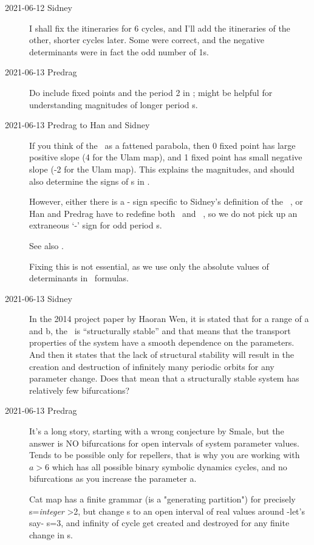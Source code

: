 \begin{description}
\item[2021-06-12 Sidney]
I shall fix the itineraries for 6 cycles, and I'll add the itineraries of
the other, shorter cycles later. Some were correct, and the negative
determinants were in fact the odd number of 1s.

\item[2021-06-13 Predrag]
Do include fixed points and the period 2 in ;
might be helpful for understanding magnitudes of longer period {\HillDet}s.

\item[2021-06-13 Predrag to Han and Sidney]
If you think of the \HenonMap\ as a fattened parabola, then 0 fixed point
has large positive slope (4 for the Ulam map), and 1 fixed point has
small negative slope (-2 for the Ulam map). This explains the magnitudes,
and should also determine the signs of {\HillDet}s in .

However, either there is a - sign specific to Sidney's definition of the
\Henon\ {\jacobianOrb}, or Han and Predrag have to redefine both
\templatt\ and \henlatt\ {\jacobianOrb}, so we do not pick up an
extraneous `-' sign for odd period {\lattstate}s.

See also .

Fixing this is not essential, as we use only the absolute values of
determinants in \po\ formulas.

\item[2021-06-13 Sidney]
In the 2014 project paper by Haoran Wen, it is stated that for a range of a
and b, the \HenonMap\ is “structurally stable” and that means that the
transport properties of the system have a smooth dependence on the
parameters. And then it states that the lack of structural stability will
result in the creation and destruction of infinitely many periodic orbits for
any parameter change. Does that mean that a structurally stable system has
relatively few bifurcations?

\item[2021-06-13 Predrag]
It's a long story, starting with a wrong conjecture by Smale, but the answer
is NO bifurcations for open intervals of system parameter values. Tends to be
possible only for repellers, that is why you are working with \Henon\ $a>6$ which
has all possible binary symbolic dynamics cycles, and no bifurcations as you
increase the parameter a.

Cat map has a finite grammar (is a "generating partition") for precisely
s=\emph{integer} >2, but change s to an open interval of real values around
-let's say- s=3, and
infinity of cycle get created and destroyed for any finite change in s.


\end{description}
